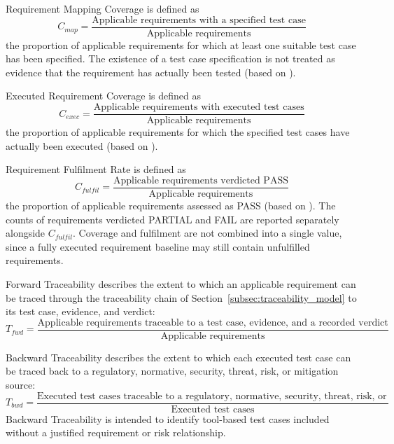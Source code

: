 Requirement Mapping Coverage is defined as
\begin{equation}
	C_{map} = \frac{\text{Applicable requirements with a specified test case}}{\text{Applicable requirements}}
\end{equation}
the proportion of applicable requirements for which at least one suitable test case has been specified. The existence of a test case specification is not treated as evidence that the requirement has actually been tested (based on \cite[p. 223]{Witte2019}).

Executed Requirement Coverage is defined as
\begin{equation}
	C_{exec} = \frac{\text{Applicable requirements with executed test cases}}{\text{Applicable requirements}}
\end{equation}
the proportion of applicable requirements for which the specified test cases have actually been executed (based on \cite[p. 223]{Witte2019}).

Requirement Fulfilment Rate is defined as
\begin{equation}
	C_{fulfil} = \frac{\text{Applicable requirements verdicted PASS}}{\text{Applicable requirements}}
\end{equation}
the proportion of applicable requirements assessed as PASS (based on \cite[p. 223]{Witte2019}). The counts of requirements verdicted PARTIAL and FAIL are reported separately alongside $C_{fulfil}$. Coverage and fulfilment are not combined into a single value, since a fully executed requirement baseline may still contain unfulfilled requirements.

Forward Traceability describes the extent to which an applicable requirement can be traced through the traceability chain of Section~\ref{subsec:traceability_model} to its test case, evidence, and verdict:
\begin{equation}
	T_{fwd} = \frac{\text{Applicable requirements traceable to a test case, evidence, and a recorded verdict}}{\text{Applicable requirements}}
\end{equation}

Backward Traceability describes the extent to which each executed test case can be traced back to a regulatory, normative, security, threat, risk, or mitigation source:
\begin{equation}
	T_{bwd} = \frac{\text{Executed test cases traceable to a regulatory, normative, security, threat, risk, or mitigation source}}{\text{Executed test cases}}
\end{equation}
Backward Traceability is intended to identify tool-based test cases included without a justified requirement or risk relationship.




